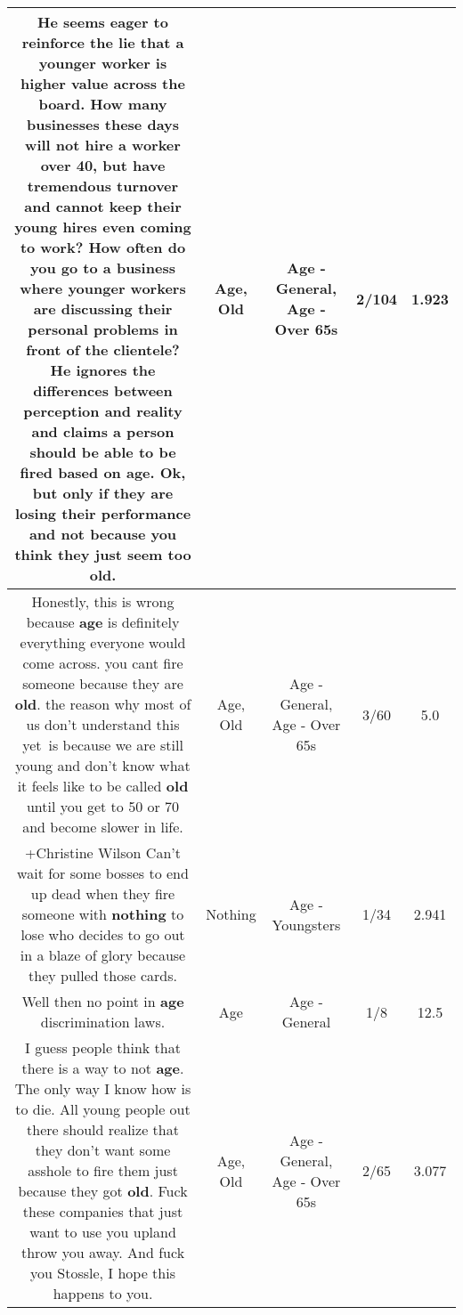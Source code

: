 \documentclass[11pt]{article}
\newlength\mylength
\begin{document}
\begin{center}
\begin{longtable}{|C{.65\mylength}|C{.30\mylength}|C{.12\mylength}|C{.12\mylength}|C{.12\mylength}|}
  \small He seems eager to reinforce the lie that a younger worker is higher value across the board.  How many businesses these days will not hire a worker over 40, but have tremendous turnover and cannot keep their young hires even coming to work?  How often do you go to a business where younger workers are discussing their personal problems in front of the clientele?  He ignores the differences between perception and reality and claims a person should be able to be fired based on \textbf{age}.  Ok, but only if they are losing their performance and not because you think they just seem too \textbf{old}.\normalsize   & Age, Old & Age - General, Age - Over 65s & 2/104 & 1.923 \\  \hline
  \small Honestly, this is wrong because \textbf{age} is definitely everything everyone would come across. you cant fire someone because they are \textbf{old}. the reason why most of us don't understand this yet is because we are still young and don't know what it feels like to be called \textbf{old} until you get to 50 or 70 and become slower in life.\normalsize   & Age, Old & Age - General, Age - Over 65s & 3/60 & 5.0 \\  \hline
  \small +Christine Wilson Can't wait for some bosses to end up dead when they fire someone with \textbf{nothing} to lose who decides to go out in a blaze of glory because they pulled those cards.\normalsize   & Nothing & Age - Youngsters & 1/34 & 2.941 \\  \hline
  \small Well then no point in \textbf{age} discrimination laws.\normalsize   & Age & Age - General & 1/8 & 12.5 \\  \hline
  \small I guess people think that there is a way to not \textbf{age}. The only way I know how is to die. All young people out there should realize that they don't want some asshole to fire them just because they got \textbf{old}. Fuck these companies that just want to use you upland throw you away. And fuck you Stossle, I hope this happens to you.\normalsize   & Age, Old & Age - General, Age - Over 65s & 2/65 & 3.077 \\  \hline

\end{longtable}
\end{center}
\end{document}
